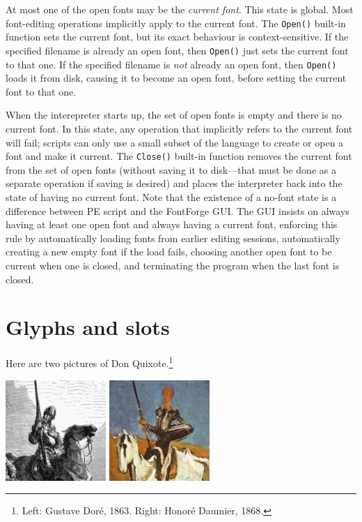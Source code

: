 \documentclass[11pt]{report}
\begin{document}
At most one of the open fonts may be the \emph{current font}.  This state is
global.  Most font-editing operations implicitly apply to the current font. 
The \texttt{Open()} built-in function sets the current font, but its exact
behaviour is context-sensitive.  If the specified filename is already an
open font, then \texttt{Open()} just sets the current font to that one.  If
the specified filename is \emph{not} already an open font, then
\texttt{Open()} loads it from disk, causing it to become an open font, before
setting the current font to that one.

When the interepreter starts up, the set of open fonts is empty and there is
no current font.  In this state, any operation that implicitly refers to the
current font will fail; scripts can only use a small subset of the language
to create or open a font and make it current.  The \texttt{Close()} built-in
function removes the current font from the set of open fonts (without saving
it to disk---that must be done as a separate operation if saving is desired)
and places the interpreter back into the state of having no current font. 
Note that the existence of a no-font state is a difference between PE script
and the FontForge GUI.  The GUI insists on always having at least one open
font and always having a current font, enforcing this rule by automatically
loading fonts from earlier editing sessions, automatically creating a new
empty font if the load fails, choosing another open font to be current when
one is closed, and terminating the program when the last font is closed.

\section{Glyphs and slots}

Here are two pictures of Don Quixote.\footnote{Left: Gustave
Dor\'{e}, 1863.  Right: Honor\'{e} Daumier, 1868.}

\begin{center}
\includegraphics[width=1.5in]{quixote-dore.jpg}\qquad
\includegraphics[width=1.5in]{quixote-daumier.jpg}
\end{center}
\end{document}
